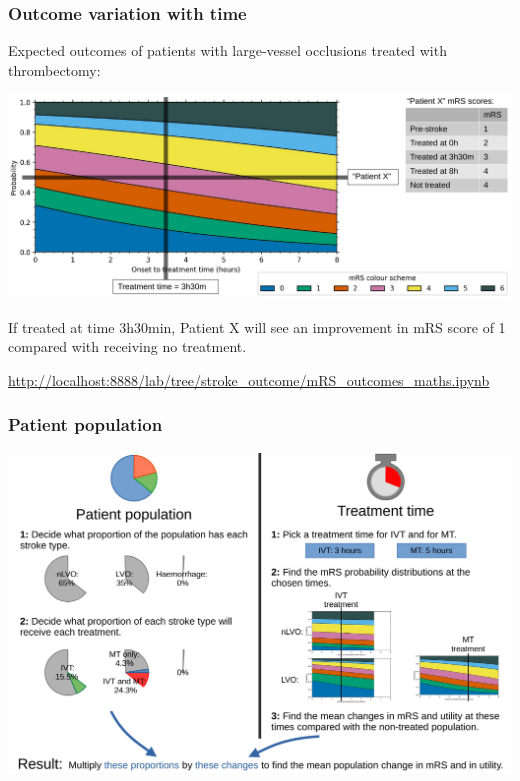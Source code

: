 \documentclass[xcolor={usenames,dvipsnames}]{beamer}
\newcommand{\smallurl}[1]{\textcolor{blue}{\fontsize{4pt}{4.8pt}\selectfont \url{#1}}}
\begin{document}
\begin{frame}
\frametitle{Outcome variation with time}

Expected outcomes of patients with large-vessel occlusions treated with thrombectomy: 

\begin{center} 
\includegraphics[width=\textwidth]{./images/probs_with_time_annotated}
\end{center} 


If treated at time 3h30min, Patient X will see an improvement in mRS score of 1 compared with receiving no treatment. 

\vspace{1em}
\smallurl{http://localhost:8888/lab/tree/stroke_outcome/mRS_outcomes_maths.ipynb}


\end{frame}



\begin{frame}
\frametitle{Patient population}

\begin{center} 
\includegraphics[width=\textwidth]{./images/population_method}
\end{center} 

\end{frame}
\end{document}
